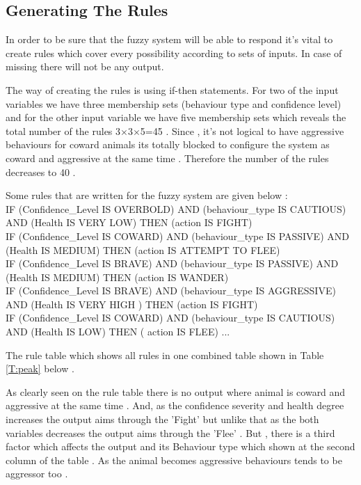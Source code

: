 \clearpage

\subsection{Generating The Rules}

In order to be sure that the fuzzy system will be able to respond it's vital to create rules which cover every possibility according to sets of inputs. In case of missing there will not be any output.

The way of creating the rules is using if-then statements. For two of the input variables we have three membership sets (behaviour type and confidence level) and for the other input variable we have five membership sets which reveals the total number of the rules 3$\times$3$\times$5=45 . Since , it's not logical to have aggressive behaviours for coward animals its totally blocked to configure the system as coward and aggressive at the same time . Therefore the number of the rules decreases to 40 .



Some rules that are written for the fuzzy system are given below :\\
IF (Confidence\_Level IS OVERBOLD) AND (behaviour\_type IS CAUTIOUS) AND (Health IS VERY LOW) THEN (action IS FIGHT)\\
IF (Confidence\_Level IS COWARD) AND (behaviour\_type IS PASSIVE) AND (Health IS MEDIUM) THEN (action IS ATTEMPT TO FLEE)\\
IF (Confidence\_Level IS BRAVE) AND (behaviour\_type IS PASSIVE) AND (Health IS MEDIUM) THEN (action IS WANDER)\\
IF (Confidence\_Level IS BRAVE) AND (behaviour\_type IS AGGRESSIVE) AND (Health IS VERY HIGH ) THEN (action IS FIGHT)\\
IF (Confidence\_Level IS COWARD) AND (behaviour\_type IS CAUTIOUS) AND (Health IS LOW) THEN ( action IS FLEE)
...

The rule table which shows all rules in one combined table shown in Table \ref{T:peak} below .



As clearly seen on the rule table there is no output where animal is coward and aggressive at the same time . And, as the confidence severity and health degree increases the output aims through the 'Fight' but unlike that as the both variables decreases the output aims through the 'Flee' . But , there is a third factor which affects the output and its Behaviour type which shown at the second column of the table . As the animal becomes aggressive behaviours tends to be aggressor too .


